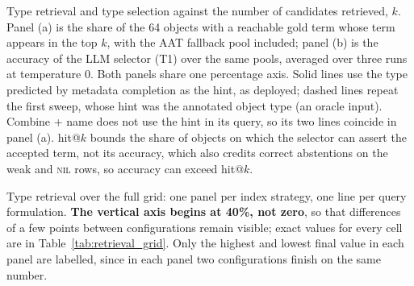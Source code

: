
\caption{Type retrieval and type selection against the number of candidates retrieved, $k$. Panel (a) is the share of the 64 objects with a reachable gold term whose term appears in the top $k$, with the AAT fallback pool included; panel (b) is the accuracy of the LLM selector (T1) over the same pools, averaged over three runs at temperature 0. Both panels share one percentage axis. Solid lines use the type predicted by metadata completion as the hint, as deployed; dashed lines repeat the first sweep, whose hint was the annotated object type (an oracle input). Combine + name does not use the hint in its query, so its two lines coincide in panel (a). hit@$k$ bounds the share of objects on which the selector can assert the accepted term, not its accuracy, which also credits correct abstentions on the weak and \textsc{nil} rows, so accuracy can exceed hit@$k$.}


\caption{Type retrieval over the full grid: one panel per index strategy, one line per query formulation. \textbf{The vertical axis begins at 40\%, not zero}, so that differences of a few points between configurations remain visible; exact values for every cell are in Table~\ref{tab:retrieval_grid}. Only the highest and lowest final value in each panel are labelled, since in each panel two configurations finish on the same number.}
